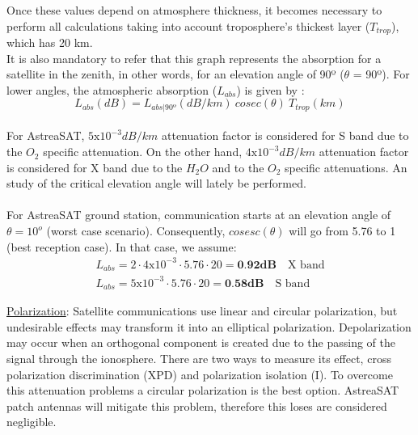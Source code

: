 Once these values depend on atmosphere thickness, it becomes necessary to perform all calculations taking into account troposphere’s thickest layer ($T_{trop}$), which has 20 km.\\
It is also mandatory to refer that this graph represents the absorption for a satellite in the zenith, in other words, for an elevation angle of 90º ($\theta$ = 90º). For lower angles, the atmospheric absorption ($L_{abs}$) is given by \cite{Jorge2012}:
\begin{equation}
	L_{abs}(dB)=L_{abs|90º} (dB/km)\ cosec(\theta)\ T_{trop}(km)
	\label{Labs}
\end{equation}
\paragraph{} For AstreaSAT, $5\mathrm{x}10^{-3}dB/km$ attenuation factor is considered for S band due to the $O_2$ specific attenuation. On the other hand, $4\mathrm{x}10^{-3}dB/km$ attenuation factor is considered for X band due to the $H_2O$ and to the $O_2$ specific attenuations. An study of the critical elevation angle will lately be performed. 
\paragraph{} For AstreaSAT ground station, communication starts at an elevation angle of $\theta=10^o$ (worst case scenario). Consequently, $cosesc(\theta)$ will go from 5.76 to 1 (best reception case). In that case, we assume:
\begin{align*}
	L_{abs}=2\cdot4\mathrm{x}10^{-3}\cdot5.76\cdot20 =\textbf{0.92dB} \quad \text{X band}\\
	L_{abs}=5\mathrm{x}10^{-3}\cdot5.76\cdot20 =\textbf{0.58dB} \quad \text{S band}
\end{align*}

\underline{Polarization}: Satellite communications use linear and circular polarization, but undesirable effects may transform it into an elliptical polarization. Depolarization may occur when an orthogonal component is created due to the passing of the signal through the ionosphere. There are two ways to measure its effect, cross polarization discrimination (XPD) and polarization isolation (I)\cite{Jorge2012}. To overcome this attenuation problems a circular polarization is the best option. AstreaSAT patch antennas will mitigate this problem, therefore this loses are considered negligible.\\

